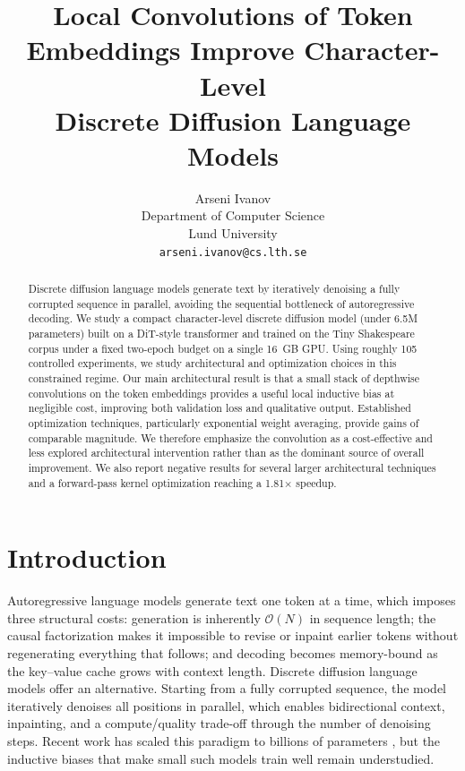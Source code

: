 \documentclass[11pt]{article}
\title{Local Convolutions of Token Embeddings Improve Character-Level\\
Discrete Diffusion Language Models}
\author{Arseni Ivanov \\
  Department of Computer Science \\
  Lund University \\
  \texttt{arseni.ivanov@cs.lth.se} \\}
\begin{document}
\maketitle

\begin{abstract}
Discrete diffusion language models generate text by iteratively denoising a
fully corrupted sequence in parallel, avoiding the sequential bottleneck of
autoregressive decoding. We study a compact character-level discrete diffusion
model (under 6.5M parameters) built on a DiT-style transformer and trained on
the Tiny Shakespeare corpus under a fixed two-epoch budget on a single 16~GB
GPU. Using roughly 105 controlled experiments, we study architectural and optimization choices in this constrained regime. Our main architectural result is that a small stack of depthwise convolutions on the token embeddings provides a useful local inductive bias at negligible cost, improving both validation loss and qualitative output. Established optimization techniques, particularly exponential weight averaging, provide gains of comparable magnitude. We therefore emphasize the convolution as a cost-effective and less explored architectural intervention rather than as the dominant source of overall improvement. We also report negative results for several larger architectural techniques and a forward-pass kernel optimization reaching a 1.81× speedup.
\end{abstract}

\section{Introduction}

Autoregressive language models generate text one token at a time, which imposes
three structural costs: generation is inherently $\mathcal{O}(N)$ in sequence
length; the causal factorization makes it impossible to revise or inpaint
earlier tokens without regenerating everything that follows; and decoding
becomes memory-bound as the key--value cache grows with context length.
Discrete diffusion language models
\citep{austin2021d3pm,lou2024sedd,sahoo2024mdlm} offer an alternative. Starting
from a fully corrupted sequence, the model iteratively denoises all positions in
parallel, which enables bidirectional context, inpainting, and a compute/quality
trade-off through the number of denoising steps. Recent work has scaled this
paradigm to billions of parameters \citep{nie2025llada,arriola2025block}, but
the inductive biases that make small such models train well remain understudied.
\end{document}
